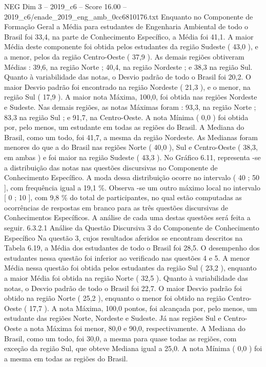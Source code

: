 \begin{textsample}{NEG Dim 3 – 2019\_c6 – Score 16.00 – 2019\_c6/enade\_2019\_eng\_amb\_0cc6810176.txt}
Enquanto no Componente de Formação Geral a Média para estudantes de Engenharia Ambiental de todo o Brasil foi 33,4, na parte de Conhecimento Específico, a Média foi 41,1.
A maior Média deste componente foi obtida pelos estudantes da região Sudeste ( 43,0 ), e a menor, pelos da região Centro-Oeste ( 37,9 ).
As demais regiões obtiveram Médias : 39,6, na região Norte ; 40,4, na região Nordeste ; e 38,3 na região Sul.
Quanto à variabilidade das notas, o Desvio padrão de todo o Brasil foi 20,2.
O maior Desvio padrão foi encontrado na região Nordeste ( 21,3 ), e o menor, na região Sul ( 17,9 ).
A maior nota Máxima, 100,0, foi obtida nas regiões Nordeste e Sudeste.
Nas demais regiões, as notas Máximas foram : 93,3, na região Norte ; 83,3 na região Sul ; e 91,7, na Centro-Oeste.
A nota Mínima ( 0,0 ) foi obtida por, pelo menos, um estudante em todas as regiões do Brasil.
A Mediana do Brasil, como um todo, foi 41,7, a mesma da região Nordeste.
As Medianas foram menores do que a do Brasil nas regiões Norte ( 40,0 ), Sul e Centro-Oeste ( 38,3, em ambas ) e foi maior na região Sudeste ( 43,3 ).
No Gráfico 6.11, representa -se a distribuição das notas nas questões discursivas no Componente de Conhecimento Específico.
A moda dessa distribuição ocorre no intervalo ( 40 ; 50 ], com frequência igual a 19,1 \%.
Observa -se um outro máximo local no intervalo [ 0 ; 10 ], com 9,8 \% do total de participantes, no qual estão computadas as ocorrências de respostas em branco para as três questões discursivas de Conhecimentos Específicos.
A análise de cada uma destas questões será feita a seguir. 6.3.2.1 Análise da Questão Discursiva 3 do Componente de Conhecimento Específico Na questão 3, cujos resultados aferidos se encontram descritos na Tabela 6.19, a Média dos estudantes de todo o Brasil foi 28,5.
O desempenho dos estudantes nessa questão foi inferior ao verificado nas questões 4 e 5.
A menor Média nessa questão foi obtida pelos estudantes da região Sul ( 23,2 ), enquanto a maior Média foi obtida na região Norte ( 32,5 ).
Quanto à variabilidade das notas, o Desvio padrão de todo o Brasil foi 22,7.
O maior Desvio padrão foi obtido na região Norte ( 25,2 ), enquanto o menor foi obtido na região Centro-Oeste ( 17,7 ).
A nota Máxima, 100,0 pontos, foi alcançada por, pelo menos, um estudante das regiões Norte, Nordeste e Sudeste.
Já nas regiões Sul e Centro-Oeste a nota Máxima foi menor, 80,0 e 90,0, respectivamente.
A Mediana do Brasil, como um todo, foi 30,0, a mesma para quase todas as regiões, com exceção da região Sul, que obteve Mediana igual a 25,0.
A nota Mínima ( 0,0 ) foi a mesma em todas as regiões do Brasil.

\end{textsample}
